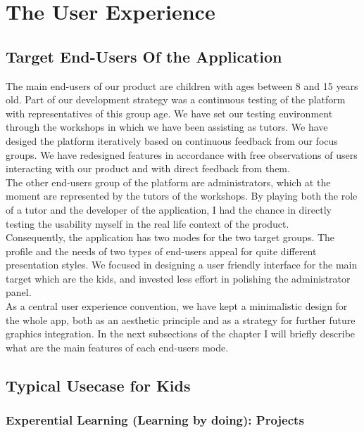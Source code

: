 
\chapter{The User Experience}


\section{Target End-Users Of the Application}

The main end-users of our product are children with ages between 8 and 15 years old. Part of our development strategy was a continuous testing of the platform with representatives of this group age. We have set our testing environment through the workshops in which we have been assisting as tutors. 
We have desiged the platform iteratively based on continuous feedback from our focus groups. We have redesigned features in accordance with free observations of users interacting with our product and with direct feedback from them. \\

The other end-users group of the platform are administrators, which at the moment are represented by the tutors of the workshops. By playing both the role of a tutor and the developer of the application, I had the chance in directly testing the usability myself in the real life context of the product.\\

Consequently, the application has two modes for the two target groups. The profile and the needs of two types of end-users appeal for quite different presentation styles. We focused in designing a user friendly interface for the main target which are the kids, and invested less effort in polishing the administrator panel.	\\

As a central user experience convention, we have kept a minimalistic design for the whole app, both as an aesthetic principle and as a strategy for further future graphics integration.	
In the next subsections of the chapter I will briefly describe what are the main features of each end-users mode.


\section{Typical Usecase for Kids}

\subsection{Experential Learning (Learning by doing): Projects}

